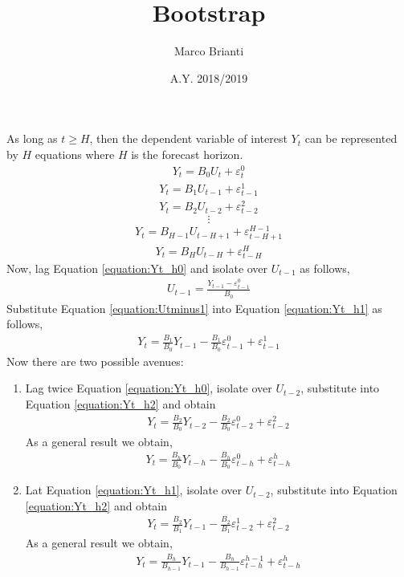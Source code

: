 \documentclass{article}
\title{Bootstrap}
\author{Marco Brianti}
\date{A.Y. 2018/2019}
\begin{document}
	\large{

\maketitle
As long as $t \geq H$, then the dependent variable of interest $Y_t$ can be represented by $H$ equations where $H$ is the forecast horizon.
\begin{eqnarray}\label{equation:Yt_h0}
Y_t = B_0 U_t + \varepsilon_t^0
\end{eqnarray}
\begin{eqnarray}\label{equation:Yt_h1}
Y_t = B_1 U_{t-1} + \varepsilon_{t-1}^1
\end{eqnarray}
\begin{eqnarray}\label{equation:Yt_h2}
Y_t = B_2 U_{t-2} + \varepsilon_{t-2}^2
\end{eqnarray}
$$
\vdots
$$
\begin{eqnarray}\label{equation:Yt_Hminus1}
Y_t = B_{H-1} U_{t-H+1} + \varepsilon_{t-H+1}^{H-1}
\end{eqnarray}
\begin{eqnarray}\label{equation:Yt_H}
Y_t = B_H U_{t-H} + \varepsilon_{t-H}^H
\end{eqnarray}
Now, lag Equation \ref{equation:Yt_h0} and isolate over $U_{t-1}$ as follows,
\begin{eqnarray}\label{equation:Utminus1}
U_{t-1} = \frac{Y_{t-1} - \varepsilon_{t-1}^0}{B_0}
\end{eqnarray}
Substitute Equation \ref{equation:Utminus1} into Equation \ref{equation:Yt_h1} as follows,
\begin{eqnarray}\label{equation:Yt_Ytminus1}
Y_t = \frac{B_1}{B_0} Y_{t-1} - \frac{B_1}{B_0} \varepsilon_{t-1}^0 + \varepsilon_{t-1}^1
\end{eqnarray}
Now there are two possible avenues:
\begin{enumerate}
	\item Lag twice Equation \ref{equation:Yt_h0}, isolate over $U_{t-2}$, substitute into Equation \ref{equation:Yt_h2} and obtain
	\begin{eqnarray}
	Y_t = \frac{B_2}{B_0} Y_{t-2} - \frac{B_2}{B_0} \varepsilon_{t-2}^0 + \varepsilon_{t-2}^2
	\end{eqnarray}
	As a general result we obtain,
		\begin{eqnarray}
	Y_t = \frac{B_h}{B_0} Y_{t-h} - \frac{B_h}{B_0} \varepsilon_{t-h}^0 + \varepsilon_{t-h}^h
	\end{eqnarray}
	\item Lat Equation \ref{equation:Yt_h1}, isolate over $U_{t-2}$, substitute into Equation \ref{equation:Yt_h2} and obtain 
		\begin{eqnarray}
	Y_t = \frac{B_2}{B_1} Y_{t-1} - \frac{B_2}{B_1} \varepsilon_{t-2}^1 + \varepsilon_{t-2}^2
	\end{eqnarray}
	As a general result we obtain,
	\begin{eqnarray}
	Y_t = \frac{B_h}{B_{h-1}} Y_{t-1} - \frac{B_h}{B_{h-1}} \varepsilon_{t-h}^{h-1} + \varepsilon_{t-h}^h
	\end{eqnarray}
\end{enumerate}




}
\end{document}
